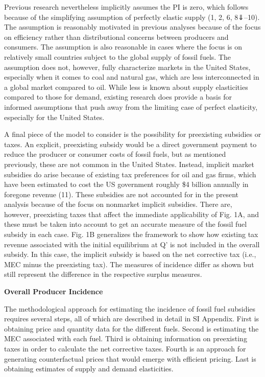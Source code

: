 \documentclass[
]{book}
\begin{document}
Previous research nevertheless implicitly assumes the PI is zero, which follows because of the simplifying assumption of perfectly elastic supply (1, 2, 6, 8⇓--10). The assumption is reasonably motivated in previous analyses because of the focus on efficiency rather than distributional concerns between producers and consumers. The assumption is also reasonable in cases where the focus is on relatively small countries subject to the global supply of fossil fuels. The assumption does not, however, fully characterize markets in the United States, especially when it comes to coal and natural gas, which are less interconnected in a global market compared to oil. While less is known about supply elasticities compared to those for demand, existing research does provide a basis for informed assumptions that push away from the limiting case of perfect elasticity, especially for the United States.

A final piece of the model to consider is the possibility for preexisting subsidies or taxes. An explicit, preexisting subsidy would be a direct government payment to reduce the producer or consumer costs of fossil fuels, but as mentioned previously, these are not common in the United States. Instead, implicit market subsidies do arise because of existing tax preferences for oil and gas firms, which have been estimated to cost the US government roughly \$4 billion annually in foregone revenue (11). These subsidies are not accounted for in the present analysis because of the focus on nonmarket implicit subsidies. There are, however, preexisting taxes that affect the immediate applicability of Fig. 1A, and these must be taken into account to get an accurate measure of the fossil fuel subsidy in each case. Fig. 1B generalizes the framework to show how existing tax revenue associated with the initial equilibrium at Q' is not included in the overall subsidy. In this case, the implicit subsidy is based on the net corrective tax (i.e., MEC minus the preexisting tax). The measures of incidence differ as shown but still represent the difference in the respective surplus measures.

\textbf{Overall Producer Incidence}

The methodological approach for estimating the incidence of fossil fuel subsidies requires several steps, all of which are described in detail in SI Appendix. First is obtaining price and quantity data for the different fuels. Second is estimating the MEC associated with each fuel. Third is obtaining information on preexisting taxes in order to calculate the net corrective taxes. Fourth is an approach for generating counterfactual prices that would emerge with efficient pricing. Last is obtaining estimates of supply and demand elasticities.
\end{document}
